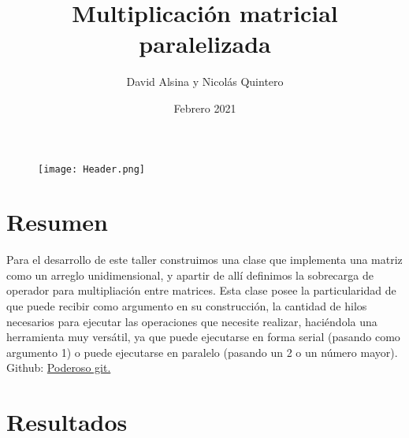 \documentclass[a4paper,12pt]{article}
\title{Multiplicación matricial paralelizada}
\author{David Alsina y Nicolás Quintero}
\date{Febrero 2021}
\begin{document}
    \begin{figure}[ht]
        \centering
        \texttt{[image: Header.png]}
        \maketitle
    \end{figure}

    \section{Resumen}
    
    Para el desarrollo de este taller construimos una clase que implementa una matriz como un arreglo unidimensional, y apartir de allí definimos la sobrecarga de operador para multipliación entre matrices. Esta clase posee la particularidad de que puede recibir como argumento en su construcción, la cantidad de hilos necesarios para ejecutar las operaciones que necesite realizar, haciéndola una herramienta muy versátil, ya que puede ejecutarse en forma serial (pasando como argumento 1) 
    o puede ejecutarse en paralelo (pasando un 2 o un número mayor).\\
    
    Github: \href{https://github.com/juannico007/talleres_c.paralela.git}{\colorbox{blueMacc}{Poderoso git.}} 
    
    \section{Resultados}
\end{document}
